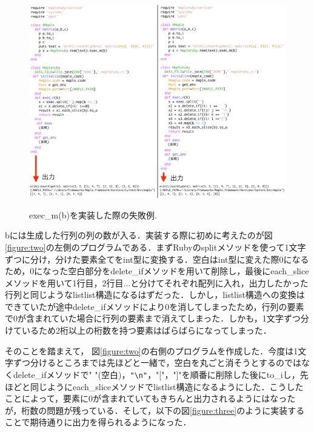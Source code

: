 \begin{figure}[htbp]\begin{center}
\includegraphics[width=12cm,bb= 0 0 937 753]{../figs/./mapleruby_eringi.004.png}
\caption{exec\_m(b)を実装した際の失敗例.}
\label{figure:two}
\label{default}\end{center}\end{figure}
bには生成した行列の列の数が入る．実装する際に初めに考えたのが図\ref{figure:two}の左側のプログラムである．まずRubyのsplitメソッドを使って1文字ずつに分け，分けた要素全てをint型に変換する．空白はint型に変えた際0になるため，0になった空白部分をdelete\_ifメソッドを用いて削除し，最後にeach\_sliceメソッドを用いて1行目，2行目...と分けてそれぞれ配列に入れ，出力したかった行列と同じようなlistlist構造になるはずだった．しかし，listlist構造への変換はできていたが途中delete\_ifメソッドにより0を消してしまったため，行列の要素で0が含まれていた場合に行列の要素まで消えてしまった．しかも，1文字ずつ分けているため2桁以上の桁数を持つ要素はばらばらになってしまった．

そのことを踏まえて， 図\ref{figure:two}の右側のプログラムを作成した．今度は1文字ずつ分けるところまでは先ほどと一緒で，空白を丸ごと消そうとするのではなくdelete\_ifメソッドで" "(空白)，\verb|"\n"|，"["，"]"を順番に削除した後にto\_iし，先ほどと同じようにeach\_sliceメソッドでlistlist構造になるようにした．こうしたことによって，要素に0が含まれていてもきちんと出力されるようにはなったが，桁数の問題が残っている．そして，以下の図\ref{figure:three}のように実装することで期待通りに出力を得られるようになった．

